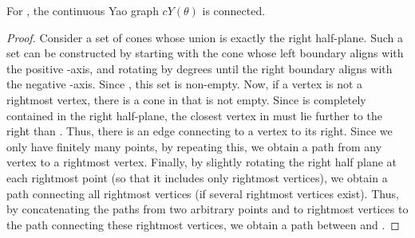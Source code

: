 \documentclass{cccg14}
\newcommand{\cyao}{\ensuremath{cY(\theta)}\xspace}
\begin{document}
\begin{theorem}\label{theorem: cyan pi is connected}
 For , the continuous Yao graph \cyao is connected.
\end{theorem}
\begin{proof}
 Consider a set  of cones whose union is exactly the right half-plane. Such a set can be constructed by starting with the cone whose left boundary aligns with the positive -axis, and rotating by  degrees until the right boundary aligns with the negative -axis. Since , this set is non-empty. 
 Now, if a vertex  is not a rightmost vertex, there is a cone  in  that is not empty. Since  is completely contained in the right half-plane, the closest vertex in  must lie further to the right than . Thus, there is an edge connecting  to a vertex to its right. Since we only have finitely many points, by repeating this, we obtain a path from any vertex to a rightmost vertex. Finally, by slightly rotating the right half plane at each rightmost point (so that it includes only rightmost vertices), we obtain a path connecting all rightmost vertices (if several rightmost vertices exist). 
 Thus, by concatenating the paths from two arbitrary points  and  to rightmost vertices to the path connecting these rightmost vertices, we obtain a path between  and .
\end{proof}
\end{document}
